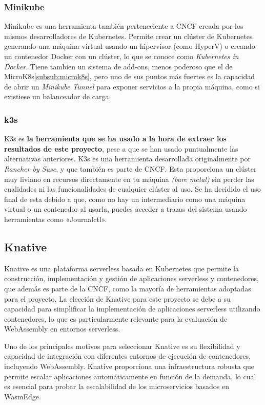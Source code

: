 \subsubsection{Minikube}

Minikube es una herramienta también perteneciente a CNCF creada por los mismos desarrolladores de Kubernetes. Permite crear un clúster de Kubernetes generando una máquina virtual usando un hipervisor (como HyperV) o creando un contenedor Docker con un clúster, lo que se conoce como \textit{Kubernetes in Docker}. Tiene tambien un sistema de add-ons, menos poderoso que el de MicroK8s\ref{subsub:microk8s}, pero uno de sus puntos más fuertes es la capacidad de abrir un \textit{Minikube Tunnel} para exponer servicios a la propia máquina, como si existiese un balanceador de carga.

\subsubsection{k3s}

K3s es \textbf{la herramienta que se ha usado a la hora de extraer los resultados de este proyecto}, pese a que se han usado puntualmente las alternativas anteriores. K3s es una herramienta desarrollada originalmente por \textit{Rancher by Suse}, y que también es parte de CNCF. Esta proporciona un clúster muy liviano en recursos directamente en tu máquina \textit{(bare metal)} sin perder las cualidades ni las funcionalidades de cualquier clúster al uso. Se ha decidido el uso final de esta debido a que, como no hay un intermediario como una máquina virtual o un contenedor al usarla, puedes acceder a trazas del sistema usando herramientas como «Journalctl».

\subsection{Knative}

Knative es una plataforma serverless basada en Kubernetes que permite la construcción, implementación y gestión de aplicaciones serverless y contenedores, que además es parte de la CNCF, como la mayoría de herramientas adoptadas para el proyecto. La elección de Knative para este proyecto se debe a su capacidad para simplificar la implementación de aplicaciones serverless utilizando contenedores, lo que es particularmente relevante para la evaluación de WebAssembly en entornos serverless.

Uno de los principales motivos para seleccionar Knative es su flexibilidad y capacidad de integración con diferentes entornos de ejecución de contenedores, incluyendo WebAssembly. Knative proporciona una infraestructura robusta que permite escalar aplicaciones automáticamente en función de la demanda, lo cual es esencial para probar la escalabilidad de los microservicios basados en WasmEdge.

